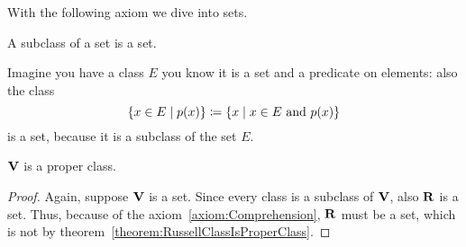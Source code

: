 With the following axiom we dive into sets.

\begin{axiom}\label{axiom:Comprehension}
A subclass of a set is a set.
\end{axiom}

Imagine you have a class \(E\) you know it is a set and a predicate on elements: also the class
\[\left\{x \in E \mid p(x)\right\} \coloneq \left\{x \mid x \in E \text{ and } p(x)\right\}\]
is a set, because it is a subclass of the set \(E\).

\begin{theorem}
\(\mathbf V\) is a proper class.
\end{theorem}

\begin{proof}
Again, suppose \(\mathbf V\) is a set. Since every class is a subclass of \(\mathbf V\), also \(\mathbf R\) is a set. Thus, because of the axiom~\ref{axiom:Comprehension}, \(\mathbf R\) must be a set, which is not by theorem~\ref{theorem:RussellClassIsProperClass}.
\end{proof}